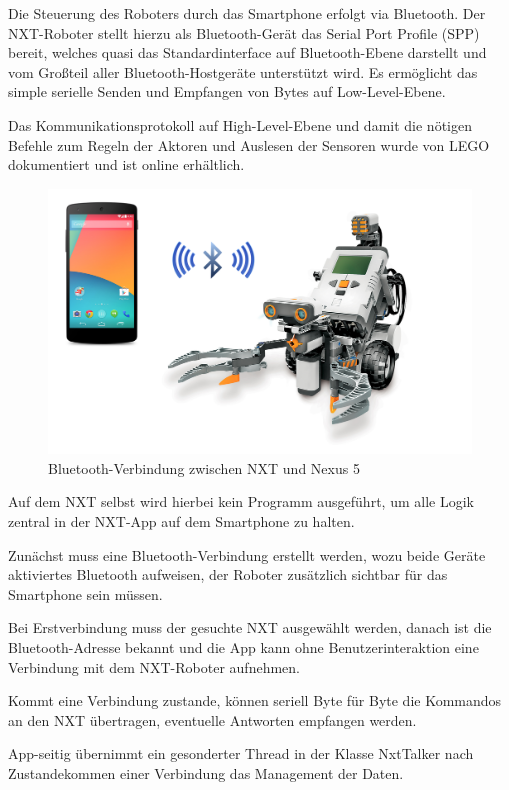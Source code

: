 Die Steuerung des Roboters durch das Smartphone erfolgt via Bluetooth. Der NXT-Roboter stellt hierzu als Bluetooth-Gerät das Serial Port Profile (SPP) bereit, welches quasi das Standardinterface auf Bluetooth-Ebene darstellt und vom Großteil aller Bluetooth-Hostgeräte unterstützt wird. Es ermöglicht das simple serielle Senden und Empfangen von Bytes auf Low-Level-Ebene.

Das Kommunikationsprotokoll auf High-Level-Ebene und damit die nötigen Befehle zum Regeln der Aktoren und Auslesen der Sensoren wurde von LEGO dokumentiert und ist online erhältlich\cite{nxt_comm_protocol}.

\begin{figure}[h]
\centering
\includegraphics[width=\textwidth/2]{Bilder/Robot/bluetooth}
\caption{Bluetooth-Verbindung zwischen NXT und Nexus 5}
\label{fig:bluetooth}
\end{figure}

Auf dem NXT selbst wird hierbei kein Programm ausgeführt, um alle Logik zentral in der NXT-App auf dem Smartphone zu halten.

Zunächst muss eine Bluetooth-Verbindung erstellt werden, wozu beide Geräte aktiviertes Bluetooth aufweisen, der Roboter zusätzlich sichtbar für das Smartphone sein müssen.

Bei Erstverbindung muss der gesuchte NXT ausgewählt werden, danach ist die Bluetooth-Adresse bekannt und die App kann ohne Benutzerinteraktion eine Verbindung mit dem NXT-Roboter aufnehmen.

Kommt eine Verbindung zustande, können seriell Byte für Byte die Kommandos an den NXT übertragen, eventuelle Antworten empfangen werden.

App-seitig übernimmt ein gesonderter Thread in der Klasse NxtTalker nach Zustandekommen einer Verbindung das Management der Daten.

